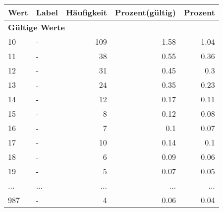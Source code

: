      \begin{longtable}{lXrrr}
     \toprule
     \textbf{Wert} & \textbf{Label} & \textbf{Häufigkeit} & \textbf{Prozent(gültig)} & \textbf{Prozent} \\
     \endhead
     \midrule
     \multicolumn{5}{l}{\textbf{Gültige Werte}}\\
        10 & \multicolumn{1}{X}{-} & %
          \num{109} &
          \num[round-mode=places,round-precision=2]{1,58} &
          \num[round-mode=places,round-precision=2]{1,04} \\
        11 & \multicolumn{1}{X}{-} & %
          \num{38} &
          \num[round-mode=places,round-precision=2]{0,55} &
          \num[round-mode=places,round-precision=2]{0,36} \\
        12 & \multicolumn{1}{X}{-} & %
          \num{31} &
          \num[round-mode=places,round-precision=2]{0,45} &
          \num[round-mode=places,round-precision=2]{0,3} \\
        13 & \multicolumn{1}{X}{-} & %
          \num{24} &
          \num[round-mode=places,round-precision=2]{0,35} &
          \num[round-mode=places,round-precision=2]{0,23} \\
        14 & \multicolumn{1}{X}{-} & %
          \num{12} &
          \num[round-mode=places,round-precision=2]{0,17} &
          \num[round-mode=places,round-precision=2]{0,11} \\
        15 & \multicolumn{1}{X}{-} & %
          \num{8} &
          \num[round-mode=places,round-precision=2]{0,12} &
          \num[round-mode=places,round-precision=2]{0,08} \\
        16 & \multicolumn{1}{X}{-} & %
          \num{7} &
          \num[round-mode=places,round-precision=2]{0,1} &
          \num[round-mode=places,round-precision=2]{0,07} \\
        17 & \multicolumn{1}{X}{-} & %
          \num{10} &
          \num[round-mode=places,round-precision=2]{0,14} &
          \num[round-mode=places,round-precision=2]{0,1} \\
        18 & \multicolumn{1}{X}{-} & %
          \num{6} &
          \num[round-mode=places,round-precision=2]{0,09} &
          \num[round-mode=places,round-precision=2]{0,06} \\
        19 & \multicolumn{1}{X}{-} & %
          \num{5} &
          \num[round-mode=places,round-precision=2]{0,07} &
          \num[round-mode=places,round-precision=2]{0,05} \\
       ... & ... & ... & ... & ... \\
        987 & \multicolumn{1}{X}{-} & %
          \num{4} &
          \num[round-mode=places,round-precision=2]{0,06} &
          \num[round-mode=places,round-precision=2]{0,04} \\


\end{longtable}
